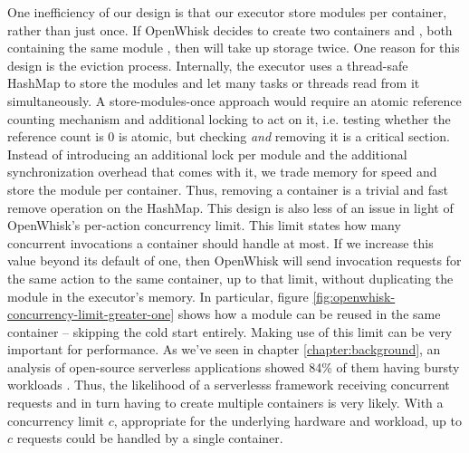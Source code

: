 One inefficiency of our design is that our executor store modules per container, rather than just once. If OpenWhisk decides to create two containers  and , both containing the same module , then  will take up storage twice. One reason for this design is the eviction process. Internally, the executor uses a thread-safe HashMap to store the modules and let many tasks or threads read from it simultaneously. A store-modules-once approach would require an atomic reference counting mechanism and additional locking to act on it, i.e. testing whether the reference count is 0 is atomic, but checking \emph{and} removing it is a critical section. Instead of introducing an additional lock per module and the additional synchronization overhead that comes with it, we trade memory for speed and store the module per container. Thus, removing a container is a trivial and fast remove operation on the HashMap. This design is also less of an issue in light of OpenWhisk's per-action concurrency limit. This limit states how many concurrent invocations a container should handle at most. If we increase this value beyond its default of one, then OpenWhisk will send invocation requests for the same action to the same container, up to that limit, without duplicating the module in the executor's memory. In particular, figure \ref{fig:openwhisk-concurrency-limit-greater-one} shows how a module can be reused in the same container -- skipping the cold start entirely. Making use of this limit can be very important for performance. As we've seen in chapter \ref{chapter:background}, an analysis of open-source serverless applications showed 84\% of them having bursty workloads \cite{Eismann2021}. Thus, the likelihood of a serverlesss framework receiving concurrent requests and in turn having to create multiple containers is very likely. With a concurrency limit $c$, appropriate for the underlying hardware and workload, up to $c$ requests could be handled by a single container.


